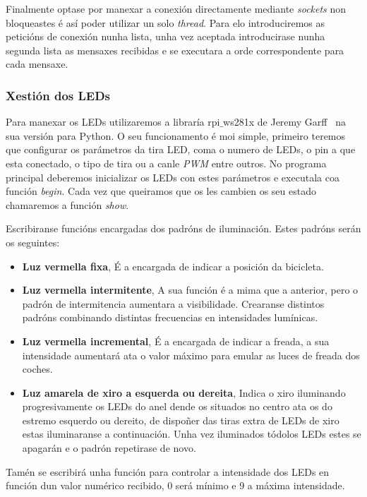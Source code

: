  Finalmente optase por manexar a conexión directamente mediante \emph{sockets} non bloqueastes é así poder utilizar un solo \emph{thread}. Para elo introduciremos as peticións de conexión nunha lista, unha vez aceptada introducirase nunha segunda lista as mensaxes recibidas e se executara a orde correspondente para cada mensaxe.

\subsubsection{Xestión dos LEDs}
Para manexar os LEDs utilizaremos a libraría rpi\(\_\)ws281x de Jeremy Garff~\cite{garffUserspaceRaspberryPi2019} na sua versión para Python. O seu funcionamento é moi simple, primeiro teremos que configurar os parámetros da tira LED, coma o numero de LEDs, o pin a que esta conectado, o tipo de tira  ou a canle \emph{PWM} entre outros. No programa principal deberemos inicializar os LEDs con estes parámetros e executala coa función \emph{begin}. Cada vez que queiramos que os les cambien os seu estado chamaremos a función \emph{show}.

Escribiranse funcións encargadas dos padróns de iluminación. Estes padróns serán os seguintes:
\begin{itemize}
    \item \textbf{Luz vermella fixa},
    É a encargada de indicar a posición da bicicleta.
    \item \textbf{Luz vermella intermitente},
    A sua función é a mima que a anterior, pero o padrón de intermitencia aumentara a visibilidade. Crearanse distintos padróns combinando distintas frecuencias en intensidades lumínicas.
    \item \textbf{Luz vermella incremental},
    É a encargada de indicar a freada, a sua intensidade aumentará ata o valor máximo para emular as luces de freada dos coches.
    \item \textbf{Luz amarela de xiro a esquerda ou dereita},
    Indica o xiro iluminando progresivamente os LEDs do anel dende os situados no centro ata os do estremo esquerdo ou dereito, de dispoñer das tiras extra de LEDs de xiro estas iluminaranse a continuación. Unha vez iluminados tódolos LEDs estes se apagarán e o padrón repetirase de novo.
\end{itemize}

Tamén se escribirá unha función para controlar a intensidade dos LEDs en función dun valor numérico recibido, 0 será mínimo e 9 a máxima intensidade.


